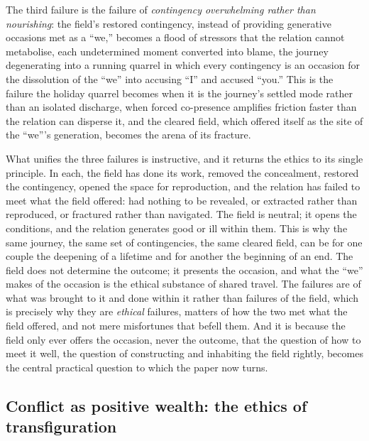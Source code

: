 The third failure is the failure of \emph{contingency overwhelming rather than nourishing}: the field's restored contingency, instead of providing generative occasions met as a ``we,'' becomes a flood of stressors that the relation cannot metabolise, each undetermined moment converted into blame, the journey degenerating into a running quarrel in which every contingency is an occasion for the dissolution of the ``we'' into accusing ``I'' and accused ``you.'' This is the failure the holiday quarrel becomes when it is the journey's settled mode rather than an isolated discharge, when forced co-presence amplifies friction faster than the relation can disperse it, and the cleared field, which offered itself as the site of the ``we'''s generation, becomes the arena of its fracture.

What unifies the three failures is instructive, and it returns the ethics to its single principle. In each, the field has done its work, removed the concealment, restored the contingency, opened the space for reproduction, and the relation has failed to meet what the field offered: had nothing to be revealed, or extracted rather than reproduced, or fractured rather than navigated. The field is neutral; it opens the conditions, and the relation generates good or ill within them. This is why the same journey, the same set of contingencies, the same cleared field, can be for one couple the deepening of a lifetime and for another the beginning of an end. The field does not determine the outcome; it presents the occasion, and what the ``we'' makes of the occasion is the ethical substance of shared travel. The failures are of what was brought to it and done within it rather than failures of the field, which is precisely why they are \emph{ethical} failures, matters of how the two met what the field offered, and not mere misfortunes that befell them. And it is because the field only ever offers the occasion, never the outcome, that the question of how to meet it well, the question of constructing and inhabiting the field rightly, becomes the central practical question to which the paper now turns.

\subsection{Conflict as positive wealth: the ethics of transfiguration}
\label{p21:sub:ethics-conflict-positive}

